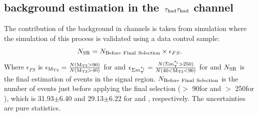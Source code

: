 \subsection{\texorpdfstring{\wjets background estimation in the $\,\tau_{\rm had}\tau_{\rm had}$ channel}{W+jets background estimation in the tau-tau channel}}
\label{sect:bkgW}
The contribution of the \wjets background in \tauTau channels is taken from simulation where the simulation of this process is validated using a data control sample: 
\begin{equation}
N_{\rm SR} = N_{\rm Before~Final~Selection} \times \epsilon_{FS}.
\end{equation}
Where $\epsilon_{FS}$ is $\epsilon_{ \rm M_{T2}}= \frac{N (\rm M_{T2}>90)}{N (\rm M_{T2}>40)}$ for \binone and $\epsilon_{\Sigma m_{\rm T}^{\tau_i}}=\frac{N (\Sigma m_{\rm T}^{\tau_i}>250)}{N(40<\rm M_{T2}<90)}$ for \bintwo and $N_{\rm SR}$ is the final estimation of \wjets events in the signal region. $N_{\rm Before~Final~Selection}$ is the number of \wjets events just before applying the final selection 
(\mttwo $>$ 90\GeV for \binone and \SumMT $>$ 250\GeV for \bintwo), which is 31.93$\pm$6.40 and 29.13$\pm$6.22 for \binone and
\bintwo, respectively. The uncertainties are pure statistics. %

